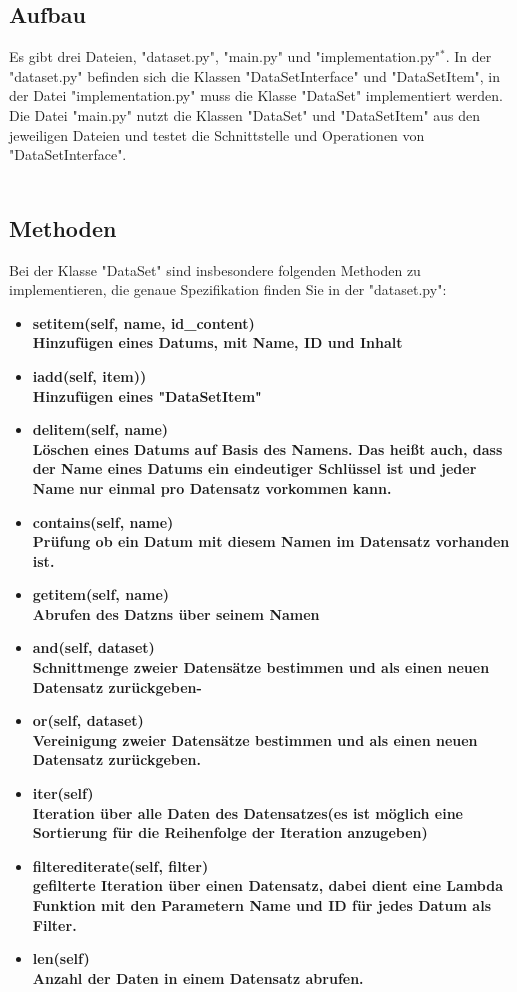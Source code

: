 \documentclass[titlepage]{article}
\begin{document}
\subsection{Aufbau}
Es gibt drei Dateien, "dataset.py", "main.py" und "implementation.py"$^*$.
In der "dataset.py" befinden sich die Klassen "DataSetInterface" und "DataSetItem",
in der Datei "implementation.py" muss die Klasse "DataSet" implementiert werden.
Die Datei "main.py" nutzt die Klassen "DataSet" und "DataSetItem" aus den jeweiligen Dateien und testet die Schnittstelle und Operationen von "DataSetInterface".\\
\\
\subsection{Methoden}
Bei der Klasse "DataSet" sind insbesondere folgenden Methoden zu implementieren, die genaue Spezifikation finden Sie in der "dataset.py":\\
    \begin{itemize}
        \item \bf setitem(self, name, id\_content)\normalfont\\
  Hinzufügen eines Datums, mit Name, ID und Inhalt
  \item \bf iadd(self, item))\normalfont\\
  Hinzufügen eines "DataSetItem"
  \item \bf delitem(self, name)\normalfont\\
  Löschen eines Datums auf Basis des Namens. Das heißt auch, dass der Name eines Datums ein eindeutiger Schlüssel ist und jeder Name nur einmal pro Datensatz vorkommen kann.
  \item \bf contains(self, name) \normalfont\\
  Prüfung ob ein Datum mit diesem Namen im Datensatz vorhanden ist.
  \item \bf getitem(self, name)\normalfont\\
  Abrufen des Datzns über seinem Namen 
  \item \bf and(self, dataset)\normalfont\\
  Schnittmenge zweier Datensätze bestimmen und als einen neuen Datensatz zurückgeben-
  \item \bf or(self, dataset)\normalfont\\
  Vereinigung zweier Datensätze bestimmen und als einen neuen Datensatz zurückgeben.
  \item \bf iter(self)\normalfont\\
  Iteration über alle Daten des Datensatzes(es ist möglich eine Sortierung für die Reihenfolge der Iteration anzugeben)
  \item \bf filterediterate(self, filter)\normalfont\\
  gefilterte Iteration über einen Datensatz, dabei dient eine Lambda Funktion mit den Parametern Name und ID für jedes Datum als Filter.
  \item \bf len(self)\normalfont\\
  Anzahl der Daten in einem Datensatz abrufen.\\
    \end{itemize}
  
\end{document}
